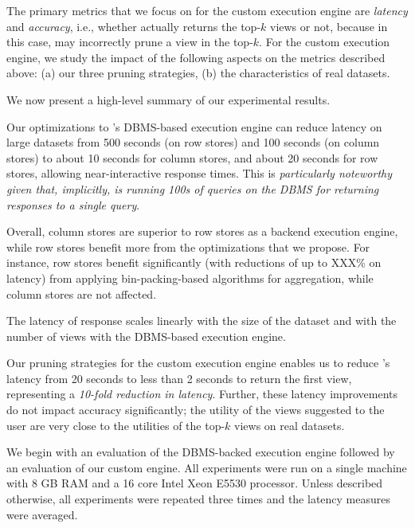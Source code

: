 The primary metrics that we focus on for the custom execution engine
are {\em latency} and {\em accuracy}, i.e., whether \VizRecDB
actually returns the top-$k$ views or not, because
in this case, \VizRecDB may incorrectly prune a view in the top-$k$.
For the custom execution engine, we study the impact of the following
aspects on the metrics described above:
(a) our three pruning strategies, 
(b) the characteristics of real datasets. 


We now present a high-level summary of our experimental results. 
\squishlist
\item Our optimizations to \VizRecDB's DBMS-based execution engine can reduce
latency on large datasets from 500 seconds (on row stores) and 100 seconds (on column stores)
to about 10 seconds for column stores, and about 20 seconds for row stores,
allowing near-interactive response times. This is {\em particularly noteworthy given that, implicitly,
\VizRecDB is running 100s of queries on the DBMS for returning responses to a single \VizRecDB query}.

\item Overall, column stores are superior to row stores 
as a backend execution engine, while row stores benefit more from the optimizations 
that we propose. For instance, row stores benefit significantly (with reductions
of up to XXX\% on latency) from applying
bin-packing-based algorithms for aggregation, 
while column stores are not affected. 

\item The latency of response scales linearly 
with the size of the dataset and with the number of views with
the DBMS-based execution engine.

\item Our pruning strategies for the custom execution engine 
enables us to reduce \VizRecDB's latency from 20 seconds to less than 2 seconds
to return the first view, representing a {\em 10-fold reduction in latency}.
Further, these latency improvements do not impact accuracy significantly;
the utility of the views suggested to the user are very close to the utilities
of the top-$k$ views on real datasets.

\squishend
We begin with an evaluation of the DBMS-backed execution engine followed by an
evaluation of our custom engine. All experiments were run on a 
single machine with 8 GB RAM and a 16 core Intel Xeon E5530 processor. 
Unless described otherwise, all experiments were 
repeated three times and the latency measures were
averaged.

